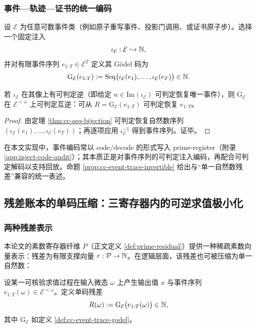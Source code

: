 \subsubsection{事件—轨迹—证书的统一编码}\label{subsubsec:cc-event-trace}
\begin{definition}\label{def:cc-event-trace-godel}
设 $\mathcal{E}$ 为任意可数事件类（例如原子重写事件、投影门调用、或证书原子步）。选择一个固定注入
$$
\iota_{\mathcal{E}}:\mathcal{E}\hookrightarrow \mathbb{N},
$$
并对有限事件序列 $e_{1:T}\in\mathcal{E}^{T}$ 定义其 Gödel 码为
$$
\mathrm{G}_{\mathcal{E}}(e_{1:T})
:=\mathrm{Seq}\bigl(\iota_{\mathcal{E}}(e_1),\dots,\iota_{\mathcal{E}}(e_T)\bigr)\in\mathbb{N}.
$$
\end{definition}

\begin{proposition}[事件轨迹的可判定互逆]\label{prop:cc-event-trace-invertible}
若 $\iota_{\mathcal{E}}$ 在其像上有可判定逆（即给定 $n\in\mathrm{Im}(\iota_{\mathcal{E}})$ 可判定恢复唯一事件），则 $\mathrm{G}_{\mathcal{E}}$ 在 $\mathcal{E}^{<\omega}$ 上可判定互逆：可从 $R=\mathrm{G}_{\mathcal{E}}(e_{1:T})$ 可判定恢复 $e_{1:T}$。
\end{proposition}

\begin{proof}
由定理 \ref{thm:cc-seq-bijection} 可判定恢复自然数序列 $(\iota_{\mathcal{E}}(e_1),\dots,\iota_{\mathcal{E}}(e_T))$；再逐项应用 $\iota_{\mathcal{E}}^{-1}$ 得到事件序列。证毕。
\end{proof}

\begin{remark}
在本文实现中，事件编码常以 $\mathrm{code}/\mathrm{decode}$ 的形式写入 prime-register（附录 \ref{app:inject-code-audit}）；其本质正是对事件序列的可判定注入编码，再配合可判定解码以支持回放。命题 \ref{prop:cc-event-trace-invertible} 给出与“单一自然数残差”兼容的统一表述。
\end{remark}

\subsection{残差账本的单码压缩：三寄存器内的可逆求值极小化}\label{subsec:cc-singlecode-ledger}

\subsubsection{两种残差表示}
本论文的素数寄存器纤维 $P$（正文定义 \ref{def:prime-residual}）提供一种稀疏素数向量表示：残差为有限支撑向量 $r:\mathcal{P}\to\mathbb{N}$。在逻辑层面，该残差也可被压缩为单一自然数：
\begin{definition}[单码残差]\label{def:cc-singlecode-residual}
设某一可核验求值过程在输入微态 $\omega$ 上产生输出值 $x$ 与事件序列 $e_{1:T}(\omega)\in\mathcal{E}^{<\omega}$。定义单码残差
$$
R(\omega):=\mathrm{G}_{\mathcal{E}}\bigl(e_{1:T}(\omega)\bigr)\in\mathbb{N},
$$
其中 $\mathrm{G}_{\mathcal{E}}$ 如定义 \ref{def:cc-event-trace-godel}。
\end{definition}

